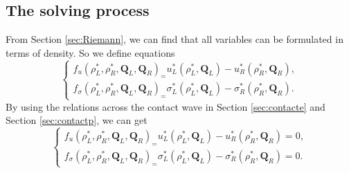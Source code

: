 \documentclass{article}
\numberwithin{equation}{section}
\numberwithin{table}{section}
\begin{document}
%
%
%

  \subsection{The solving process}\label{sec:iteration}
From Section  \ref{sec:Riemann}, we can find that all variables can be formulated in terms of density. So we define equations
\begin{equation}
\left\{
\begin{array}{c}
  f_u(\rho_L^*,\rho_R^*,\mathbf{Q}_{L},\mathbf{Q}_{R})_=  u_L^*(\rho_L^*,\mathbf{Q}_{L}) -u_R^*(\rho_R^*,\mathbf{Q}_{R}), \\
  f_\sigma(\rho_L^*,\rho_R^*,\mathbf{Q}_{L},\mathbf{Q}_{R})_=  \sigma_L^*(\rho_L^*,\mathbf{Q}_{L}) -\sigma_R^*(\rho_R^*,\mathbf{Q}_{R}).
\end{array}
\right.
\end{equation}
By using the relations across the contact wave in Section \ref{sec:contacte} and Section \ref{sec:contactp}, we can get
\begin{equation} \label{exact1}
\left\{
\begin{array}{c}
  f_u(\rho_L^*,\rho_R^*,\mathbf{Q}_{L},\mathbf{Q}_{R})_=  u_L^*(\rho_L^*,\mathbf{Q}_{L}) -u_R^*(\rho_R^*,\mathbf{Q}_{R})=0, \\
  f_\sigma(\rho_L^*,\rho_R^*,\mathbf{Q}_{L},\mathbf{Q}_{R})_=  \sigma_L^*(\rho_L^*,\mathbf{Q}_{L}) -\sigma_R^*(\rho_R^*,\mathbf{Q}_{R})=0.
\end{array}
\right.
\end{equation}
\end{document}

